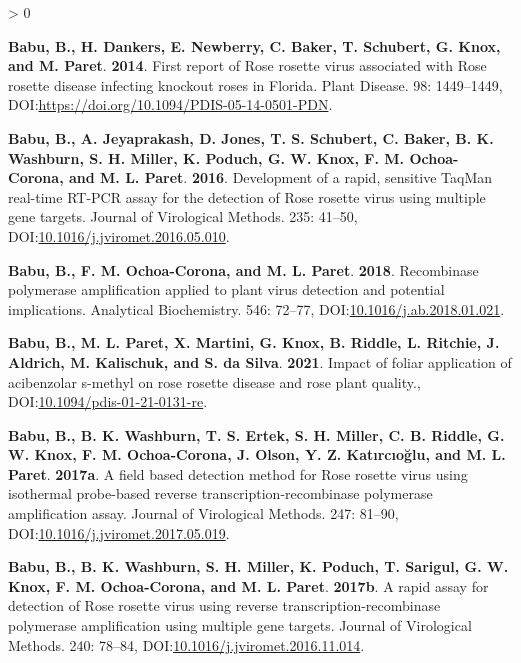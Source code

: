 \documentclass{ufdissertation}[overrideChapters] %
\newlength{\cslhangindent}
\newenvironment{CSLReferences}[2] %
 {%
  \setlength{\parindent}{0pt}
  \ifodd #1 \everypar{\setlength{\hangindent}{\cslhangindent}}\ignorespaces\fi
  \ifnum #2 > 0
  \setlength{\parskip}{#2\baselineskip}
  \fi
 }%
 {}
\begin{document}
{\begin{CSLReferences}{1}{1}
\leavevmode{}%
\textbf{Babu, B., H. Dankers, E. Newberry, C. Baker, T. Schubert, G. Knox, and M. Paret}. \textbf{2014}. First report of {Rose rosette virus} associated with {Rose rosette disease} infecting knockout roses in {Florida}. Plant Disease. 98: 1449--1449, DOI:\url{https://doi.org/10.1094/PDIS-05-14-0501-PDN}.

\leavevmode{}%
\textbf{Babu, B., A. Jeyaprakash, D. Jones, T. S. Schubert, C. Baker, B. K. Washburn, S. H. Miller, K. Poduch, G. W. Knox, F. M. Ochoa-Corona, and M. L. Paret}. \textbf{2016}. Development of a rapid, sensitive {TaqMan} real-time {RT}-{PCR} assay for the detection of {Rose rosette virus} using multiple gene targets. Journal of Virological Methods. 235: 41--50, DOI:\href{https://doi.org/10.1016/j.jviromet.2016.05.010}{10.1016/j.jviromet.2016.05.010}.

\leavevmode{}%
\textbf{Babu, B., F. M. Ochoa-Corona, and M. L. Paret}. \textbf{2018}. Recombinase polymerase amplification applied to plant virus detection and potential implications. Analytical Biochemistry. 546: 72--77, DOI:\href{https://doi.org/10.1016/j.ab.2018.01.021}{10.1016/j.ab.2018.01.021}.

\leavevmode{}%
\textbf{Babu, B., M. L. Paret, X. Martini, G. Knox, B. Riddle, L. Ritchie, J. Aldrich, M. Kalischuk, and S. da Silva}. \textbf{2021}. Impact of foliar application of acibenzolar s-methyl on rose rosette disease and rose plant quality., DOI:\href{https://doi.org/10.1094/pdis-01-21-0131-re}{10.1094/pdis-01-21-0131-re}.

\leavevmode{}%
\textbf{Babu, B., B. K. Washburn, T. S. Ertek, S. H. Miller, C. B. Riddle, G. W. Knox, F. M. Ochoa-Corona, J. Olson, Y. Z. Katırcıoğlu, and M. L. Paret}. \textbf{2017a}. A field based detection method for {Rose rosette virus} using isothermal probe-based reverse transcription-recombinase polymerase amplification assay. Journal of Virological Methods. 247: 81--90, DOI:\href{https://doi.org/10.1016/j.jviromet.2017.05.019}{10.1016/j.jviromet.2017.05.019}.

\leavevmode{}%
\textbf{Babu, B., B. K. Washburn, S. H. Miller, K. Poduch, T. Sarigul, G. W. Knox, F. M. Ochoa-Corona, and M. L. Paret}. \textbf{2017b}. A rapid assay for detection of {Rose rosette virus} using reverse transcription-recombinase polymerase amplification using multiple gene targets. Journal of Virological Methods. 240: 78--84, DOI:\href{https://doi.org/10.1016/j.jviromet.2016.11.014}{10.1016/j.jviromet.2016.11.014}.


\end{CSLReferences}}
\end{document}
